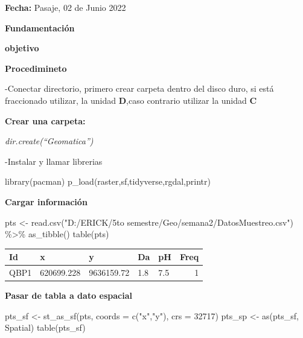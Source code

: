 \documentclass[
]{article}
\newenvironment{Shaded}{\begin{snugshade}}{\end{snugshade}}
\newcommand{\AttributeTok}[1]{\textcolor[rgb]{0.77,0.63,0.00}{#1}}
\newcommand{\DecValTok}[1]{\textcolor[rgb]{0.00,0.00,0.81}{#1}}
\newcommand{\FunctionTok}[1]{\textcolor[rgb]{0.00,0.00,0.00}{#1}}
\newcommand{\NormalTok}[1]{#1}
\newcommand{\OtherTok}[1]{\textcolor[rgb]{0.56,0.35,0.01}{#1}}
\newcommand{\SpecialCharTok}[1]{\textcolor[rgb]{0.00,0.00,0.00}{#1}}
\newcommand{\StringTok}[1]{\textcolor[rgb]{0.31,0.60,0.02}{#1}}
\begin{document}
\textbf{Fecha:} Pasaje, 02 de Junio 2022

\textbf{Fundamentación}

\textbf{objetivo}

\textbf{Procedimineto}

-Conectar directorio, primero crear carpeta dentro del disco duro, si
está fraccionado utilizar, la unidad \textbf{D},caso contrario utilizar
la unidad \textbf{C}

\textbf{Crear una carpeta: }

\emph{dir.create(``Geomatica'')}

-Instalar y llamar librerias

\begin{Shaded}
\begin{Highlighting}[]
\FunctionTok{library}\NormalTok{(pacman)}
\FunctionTok{p\_load}\NormalTok{(raster,sf,tidyverse,rgdal,printr)}
\end{Highlighting}
\end{Shaded}

\textbf{Cargar información}

\begin{Shaded}
\begin{Highlighting}[]
\NormalTok{pts }\OtherTok{\textless{}{-}} \FunctionTok{read.csv}\NormalTok{(}\StringTok{"D:/ERICK/5to semestre/Geo/semana2/DatosMuestreo.csv"}\NormalTok{) }\SpecialCharTok{\%\textgreater{}\%} \FunctionTok{as\_tibble}\NormalTok{()}
\FunctionTok{table}\NormalTok{(pts)}
\end{Highlighting}
\end{Shaded}

\begin{longtable}[]{@{}lllllr@{}}
\toprule
Id & x & y & Da & pH & Freq \\
\midrule
\endhead
QBP1 & 620699.228 & 9636159.72 & 1.8 & 7.5 & 1 \\
\bottomrule
\end{longtable}

\textbf{Pasar de tabla a dato espacial}

\begin{Shaded}
\begin{Highlighting}[]
\NormalTok{pts\_sf }\OtherTok{\textless{}{-}} \FunctionTok{st\_as\_sf}\NormalTok{(pts, }\AttributeTok{coords =} \FunctionTok{c}\NormalTok{(}\StringTok{"x"}\NormalTok{,}\StringTok{"y"}\NormalTok{), }\AttributeTok{crs =} \DecValTok{32717}\NormalTok{)}
\NormalTok{pts\_sp }\OtherTok{\textless{}{-}} \FunctionTok{as}\NormalTok{(pts\_sf, }\StringTok{\textquotesingle{}Spatial\textquotesingle{}}\NormalTok{)}
\FunctionTok{table}\NormalTok{(pts\_sf)}
\end{Highlighting}
\end{Shaded}
\end{document}
